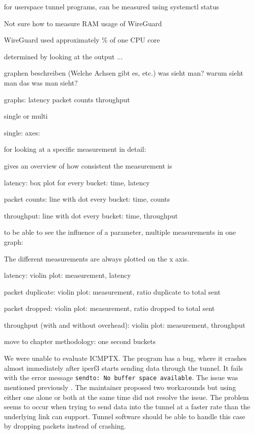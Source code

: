 for userspace tunnel programs, can be measured using systemctl status

Not sure how to measure RAM usage of WireGuard

WireGuard used approximately \% of one CPU core

determined by looking at the output ...


graphen beschreiben (Welche Achsen gibt es, etc.)
was sieht man?
warum sieht man das was man sieht?


graphs:
latency
packet counts
throughput

single or multi

single: axes:

for looking at a specific measurement in detail:

gives an overview of how consistent the measurement is

latency: box plot for every bucket: time, latency

packet counts: line with dot every bucket: time, counts

throughput: line with dot every bucket: time, throughput


to be able to see the influence of a parameter, multiple measurements in one graph:


The different measurements are always plotted on the x axis.

latency: violin plot: measurement, latency

packet duplicate: violin plot: measurement, ratio duplicate to total sent

packet dropped: violin plot: measurement, ratio dropped to total sent

throughput (with and without overhead): violin plot: measurement, throughput


move to chapter methodology:
one second buckets


We were unable to evaluate ICMPTX.
The program has a bug, where it crashes almost immediately after iperf3 starts sending data through the tunnel.
It fails with the error message \texttt{sendto: No buffer space available}.
The issue was mentioned previously \cite{icmptx-sendto-no-buffer-space-avaiable}.
The maintainer proposed two workarounds but using either one alone or both at the same time did not resolve the issue.
The problem seems to occur when trying to send data into the tunnel at a faster rate than the underlying link can support.
Tunnel software should be able to handle this case by dropping packets instead of crashing.


